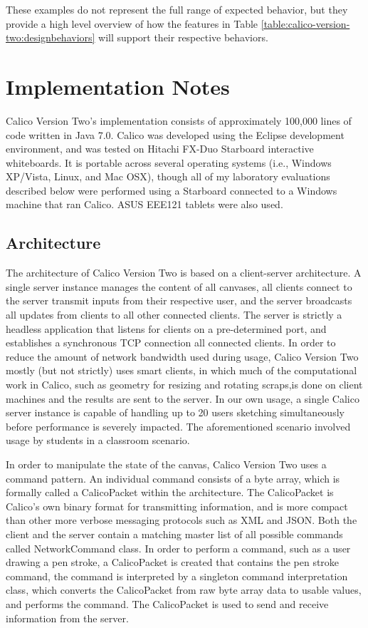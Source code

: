 \documentclass[12pt,fleqn]{ucithesis}
\begin{document}
These examples do not represent the full range of expected behavior, but they provide a high level overview of how the features in Table \ref{table:calico-version-two:designbehaviors} will support their respective behaviors.

\section{Implementation Notes}

Calico Version Two's implementation consists of approximately 100,000 lines of code written in Java 7.0. Calico was developed using the Eclipse development environment, and was tested on Hitachi FX-Duo Starboard interactive whiteboards. It is portable across several operating systems (i.e., Windows XP/Vista, Linux, and Mac OSX), though all of my laboratory evaluations described below were performed using a Starboard connected to a Windows machine that ran Calico. ASUS EEE121 tablets were also used.

\subsection{Architecture}

The architecture of Calico Version Two is based on a client-server architecture. A single server instance manages the content of all canvases, all clients connect to the server transmit inputs from their respective user, and the server broadcasts all updates from clients to all other connected clients. The server is strictly a headless application that listens for clients on a pre-determined port, and establishes a synchronous TCP connection all connected clients. In order to reduce the amount of network bandwidth used during usage, Calico Version Two mostly (but not strictly) uses smart clients, in which much of the computational work in Calico, such as geometry for resizing and rotating scraps,is done on client machines and the results are sent to the server. In our own usage, a single Calico server instance is capable of handling up to 20 users sketching simultaneously before performance is severely impacted. The aforementioned scenario involved usage by students in a classroom scenario.

In order to manipulate the state of the canvas, Calico Version Two uses a command pattern. An individual command consists of a byte array, which is formally called a CalicoPacket within the architecture. The CalicoPacket is Calico's own binary format for transmitting information, and is more compact than other more verbose messaging protocols such as XML and JSON. Both the client and the server contain a matching master list of all possible commands called NetworkCommand class. In order to perform a command, such as a user drawing a pen stroke, a CalicoPacket is created that contains the pen stroke command, the command is interpreted by a singleton command interpretation class, which converts the CalicoPacket from raw byte array data to usable values, and performs the command. The CalicoPacket is used to send and receive information from the server.
\end{document}
